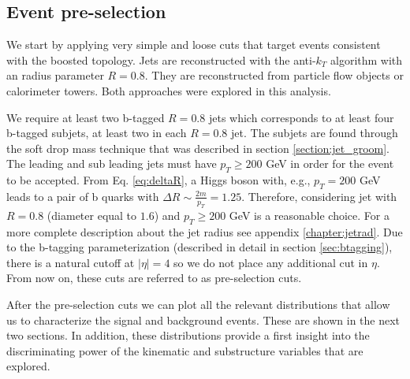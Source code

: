 
\subsection{Event pre-selection}


We start by applying very simple and loose cuts that target events consistent with the boosted topology. Jets are reconstructed with the anti-$k_T$ algorithm with an radius parameter $R=0.8$. They are reconstructed from particle flow objects or calorimeter towers. Both approaches were explored in this analysis.

We require at least two b-tagged $R=0.8$ jets which corresponds to at least four b-tagged subjets, at least two in each $R=0.8$ jet. The subjets are found through the soft drop mass technique that was described in section \ref{section:jet_groom}. The leading and sub leading jets must have $p_T\geq200$ GeV in order for the event to be accepted. From Eq. \ref{eq:deltaR}, a Higgs boson with, e.g., $p_T=200$ GeV leads to a pair of b quarks with $\Delta R\sim \frac{2m}{p_T}=1.25$. Therefore, considering jet with $R=0.8$ (diameter equal to $1.6$) and $p_T\geq 200$ GeV is a reasonable choice. For a more complete description about the jet radius see appendix \ref{chapter:jetrad}. Due to the b-tagging parameterization (described in detail in section \ref{sec:btagging}), there is a natural cutoff at $|\eta|=4$ so we do not place any additional cut in $\eta$. From now on, these cuts are referred to as pre-selection cuts.

After the pre-selection cuts we can plot all the relevant distributions that allow us to characterize the signal and background events. These are shown in the next two sections. In addition, these distributions provide a first insight into the discriminating power of the kinematic and substructure variables that are explored.  

